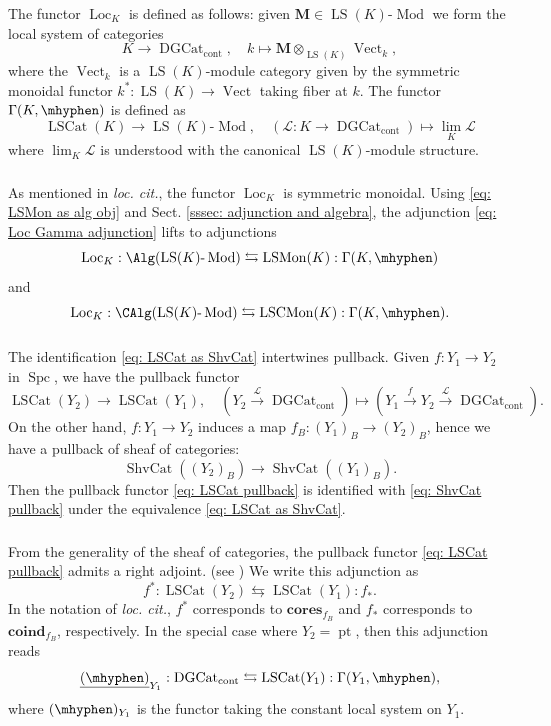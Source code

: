 \documentclass[10pt]{amsart}
\newcommand{\sssec}{\subsubsection}
\theoremstyle{remark}
\newcommand{\ul}{\underline}
\newcommand{\on}{\operatorname}
\newcommand{\cL}{\mathcal{L}}
\newcommand{\ShvCat}{\on{ShvCat}}
\newcommand{\DGcat}{\on{DGCat}_{\on{cont}}}
\newcommand{\LSCat}{\on{LSCat}}
\newcommand{\LSMon}{\on{LSMon}}
\newcommand{\LSCMon}{\on{LSCMon}}
\newcommand{\lMod}{\text{-}\on{Mod}}
\newcommand{\Vect}{\on{Vect}}
\newcommand{\Loc}{\on{Loc}}
\newcommand{\LS}{\on{LS}}
\newcommand{\Spc}{\on{Spc}}
\newcommand{\bM}{\mathbf{M}}
\newcommand{\pt}{\on{pt}}
\begin{document}
The functor $\Loc_K$ is defined as follows: given $\bM\in \LS(K)\lMod$ we form the local system of categories
    \[K\rightarrow \DGcat,\quad k\mapsto \bM\otimes_{\LS(K)}\Vect_k,\]
    where the $\Vect_k$ is a $\LS(K)$-module category given by the symmetric monoidal functor
    $k^*: \LS(K)\rightarrow \Vect$ taking fiber at $k$.
The functor $\Gamma(K,\mhyphen)$ is defined as
     \[\LSCat(K) \rightarrow \LS(K)\lMod, \quad (\cL: K\rightarrow \DGcat) \mapsto \lim_{K}\cL\]
     where $\lim_K\cL$ is understood with the canonical $\LS(K)$-module structure.

\sssec{}
As mentioned in \emph{loc. cit.}, the functor $\Loc_K$ is symmetric monoidal.
Using \eqref{eq: LSMon as alg obj} and Sect. \ref{sssec: adjunction and algebra}, the adjunction \eqref{eq: Loc Gamma adjunction} lifts to adjunctions
\[\Loc_{K}: \Alg(\LS(K)\lMod) \leftrightarrows \LSMon(K) :\Gamma(K,\mhyphen)\]
and
\[\Loc_{K}: \CAlg(\LS(K)\lMod) \leftrightarrows \LSCMon(K) :\Gamma(K,\mhyphen).\]

    



\sssec{}
The identification \eqref{eq: LSCat as ShvCat} intertwines pullback. Given $f:Y_1\rightarrow Y_2$ in $\Spc$, we have the pullback functor
    \begin{equation}\label{eq: LSCat pullback}
        \LSCat(Y_2)\rightarrow \LSCat(Y_1),\quad (Y_2\xrightarrow{\cL}\DGcat)\mapsto (Y_1\xrightarrow{f}Y_2\xrightarrow{\cL}\DGcat).
    \end{equation}
    On the other hand, $f:Y_1\rightarrow Y_2$ induces a map $f_B: (Y_1)_B\rightarrow (Y_2)_B$, hence we have a pullback of sheaf of categories:
\begin{equation}\label{eq: ShvCat pullback}
    \ShvCat((Y_2)_B)\rightarrow \ShvCat((Y_1)_B).
    \end{equation}
    Then the pullback functor \eqref{eq: LSCat pullback} is identified with \eqref{eq: ShvCat pullback} under the equivalence \eqref{eq: LSCat as ShvCat}.

    \sssec{}\label{sssec: LSCat pull push}
    From the generality of the sheaf of categories, the pullback functor \eqref{eq: LSCat pullback} admits a right adjoint. (see \cite[Sect. 3.1.3]{Ga}) We write this adjunction as
\begin{equation}\label{eq: LSCat pull push}
f^*:\LSCat(Y_2)\leftrightarrows \LSCat(Y_1):f_*.
\end{equation}
    In the notation of \emph{loc. cit.}, $f^*$ corresponds to $\textbf{cores}_{f_B}$ and $f_*$ corresponds to $\textbf{coind}_{f_B}$, respectively. In the special case where $Y_2=\pt$, then this adjunction reads
    \[\ul{(\mhyphen)}_{Y_1}:\DGcat\leftrightarrows \LSCat(Y_1): \Gamma(Y_1,\mhyphen),\]
    where $(\mhyphen)_{Y_1}$ is the functor taking the constant local system on $Y_1$.
    \medskip
    
\end{document}
